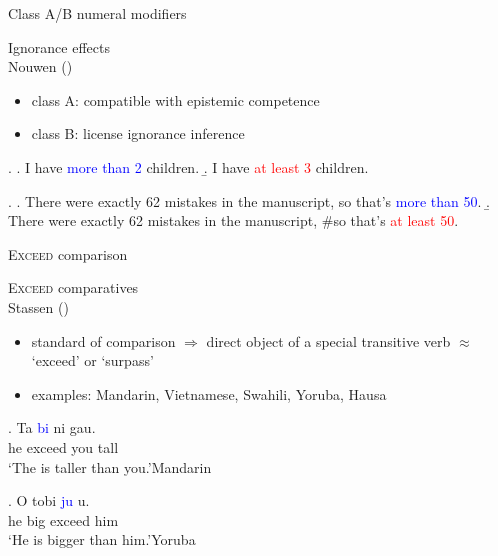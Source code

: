 \documentclass[12pt]{beamer}
\begin{document}
\begin{frame}{Class A/B numeral modifiers}

Ignorance effects\\
\scriptsize Nouwen (\citeyear{nouwen2015modified})\normalsize

\begin{itemize}
\item class A: compatible with epistemic competence
\item class B: license ignorance inference 
\end{itemize}

\ex. \a. I have \textcolor{blue}{more than 2} children.
\b. I have \textcolor{red}{at least 3} children.

\ex. \a. There were exactly 62 mistakes in the manuscript, so that's \textcolor{blue}{more than 50}.
\b. There were exactly 62 mistakes in the manuscript, \#so that's \textcolor{red}{at least 50}.

\end{frame}

\begin{frame}{\textsc{Exceed} comparison}

\textsc{Exceed} comparatives\\
\scriptsize Stassen (\citeyear{stassen1985comparison})\normalsize

\begin{itemize}
\item standard of comparison $\Rightarrow$ direct object of a special transitive verb $\approx$ `exceed' or `surpass'
\item examples: Mandarin, Vietnamese, Swahili, Yoruba, Hausa
\end{itemize}

\exg. Ta \textcolor{blue}{bi} ni gau.\label{ex:exceed-mandarin}\\
he exceed you tall\\
`The is taller than you.'\hfill \footnotesize Mandarin\normalsize

\exg. O tobi \textcolor{blue}{ju} u.\label{ex:exceed-yoruba}\\
he big exceed him\\
`He is bigger than him.'\hfill \footnotesize Yoruba \normalsize

\end{frame}
\end{document}

